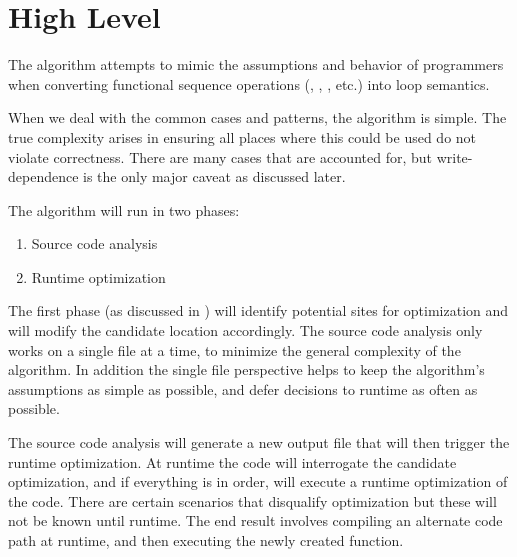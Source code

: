 \section{High Level}
The algorithm attempts to mimic the assumptions and behavior of programmers when converting functional sequence operations (, , , etc.) into  loop semantics.

When we deal with the common cases and patterns, the algorithm is simple.  The true complexity arises in ensuring all places where this could be used do not violate correctness. There are many cases that are accounted for, but write-dependence is the only major caveat as discussed later.

The algorithm will run in two phases:
  \begin{enumerate}
    \item Source code analysis 
    \item Runtime optimization 
  \end{enumerate}

The first phase (as discussed in ) will identify potential sites for optimization and will modify the candidate location accordingly.  The source code analysis only works on a single file at a time, to minimize the general complexity of the algorithm. In addition the single file perspective helps to keep the algorithm's assumptions as simple as possible, and defer decisions to runtime as often as possible.

The source code analysis will generate a new output file that will then trigger the runtime optimization.  At runtime the code will interrogate the candidate optimization, and if everything is in order, will execute a runtime optimization of the code. There are certain scenarios that disqualify optimization but these will not be known until runtime.  The end result involves compiling an alternate code path at runtime, and then executing the newly created function.  